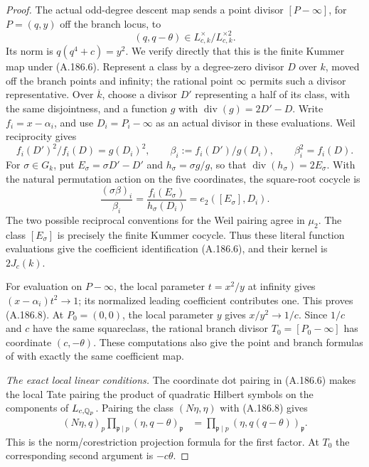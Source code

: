 \begin{proof}
The actual odd-degree descent map sends a point divisor
\([P-\infty]\), for \(P=(q,y)\) off the branch locus,
to
\[
                (q,q-\theta)\in L_{c,k}^\times/L_{c,k}^{\times2}.
\tag{A.186.8}
\]
Its norm is \(q(q^4+c)=y^2\).  We verify directly that
this is the finite Kummer map under (A.186.6).
Represent a class by a degree-zero divisor \(D\) over
\(k\), moved off the branch points and infinity; the
rational point \(\infty\) permits such a divisor
representative.  Over \(\overline k\), choose a divisor
\(D'\) representing a half of its class, with the same
disjointness, and a function \(g\) with
\(\operatorname{div}(g)=2D'-D\).  Write
\(f_i=x-\alpha_i\), and use \(D_i=P_i-\infty\)
as an actual divisor in these evaluations.  Weil
reciprocity gives
\[
 f_i(D')^2/f_i(D)=g(D_i)^2,\qquad
 \beta_i:=f_i(D')/g(D_i),\qquad \beta_i^2=f_i(D).
\]
For \(\sigma\in G_k\), put
\(E_\sigma=\sigma D'-D'\) and
\(h_\sigma=\sigma g/g\), so that
\(\operatorname{div}(h_\sigma)=2E_\sigma\).
With the natural permutation action on the five
coordinates, the square-root cocycle is
\[
 \frac{(\sigma\beta)_i}{\beta_i}
   =\frac{f_i(E_\sigma)}{h_\sigma(D_i)}
   =e_2([E_\sigma],D_i).
\]
The two possible reciprocal conventions for the Weil
pairing agree in \(\mu_2\).  The class
\([E_\sigma]\) is precisely the finite Kummer
cocycle.  Thus these literal function evaluations give
the coefficient identification (A.186.6), and their
kernel is \(2J_c(k)\).

For evaluation on \(P-\infty\), the local parameter
\(t=x^2/y\) at infinity gives
\((x-\alpha_i)t^2\to1\); its normalized leading
coefficient contributes one.  This proves (A.186.8).
At \(P_0=(0,0)\), the local parameter \(y\) gives
\(x/y^2\to1/c\).  Since \(1/c\) and \(c\)
have the same squareclass, the rational branch divisor
\(T_0=[P_0-\infty]\) has coordinate
\((c,-\theta)\).  These computations also give the
point and branch formulas of
\cite[Lemma 4.1 and Lemma 4.3(1)--(2), pp.250--251]{LegStollDescent2001}
with exactly the same coefficient map.

\emph{The exact local linear conditions.}
The coordinate dot pairing in (A.186.6) makes the local
Tate pairing the product of quadratic Hilbert symbols on
the components of \(L_{c,\mathbb Q_p}\).  Pairing the class
\((N\eta,\eta)\) with (A.186.8) gives
\[
\begin{aligned}
 (N\eta,q)_p\prod_{\mathfrak p\mid p}
                    (\eta,q-\theta)_{\mathfrak p}
 &=\prod_{\mathfrak p\mid p}
                    (\eta,q(q-\theta))_{\mathfrak p}.
\end{aligned}
\tag{A.186.9}
\]
This is the norm/corestriction projection formula for the
first factor.  At \(T_0\) the corresponding second argument
is \(-c\theta\).


\end{proof}
